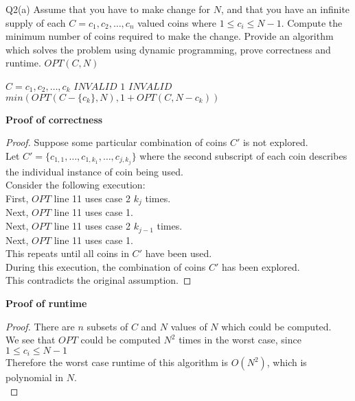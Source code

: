 \begin{problem}
  {Q2(a)}
  Assume that you have to make change for $N$, and that you have an infinite supply of each $C = c_1, c_2, \dots, c_n$ valued coins where $1 \leq c_i \leq N-1$.
  Compute the minimum number of coins required to make the change. Provide an algorithm which solves the problem using dynamic programming, prove correctness and runtime.
  $OPT(C, N)$
  \begin{algorithmic}[1]
      \STATE $C = c_1, c_2, \dots, c_k$
      \RETURN $INVALID$
      \ENDIF
      \RETURN $1$
      \ENDIF
      \RETURN $INVALID$
      \ENDIF
      \RETURN $min(OPT(C - \{c_k\}, N), 1 + OPT(C, N-c_k))$
  \end{algorithmic}
  \noindent
  \textbf{Proof of correctness}
  \begin{proof}
      Suppose some particular combination of coins $C'$ is not explored. \\
      Let $C' = \{c_{1, 1}, \dots, c_{1, k_1}, \dots, c_{j, k_j}\}$ where the second subscript of each coin describes the individual instance of coin being used. \\
      Consider the following execution: \\
      First, $OPT$ line 11 uses case 2 $k_j$ times. \\
      Next, $OPT$ line 11 uses case 1. \\
      Next, $OPT$ line 11 uses case 2 $k_{j-1}$ times. \\
      Next, $OPT$ line 11 uses case 1. \\
      This repeats until all coins in $C'$ have been used. \\
      During this execution, the combination of coins $C'$ has been explored. \\
      This contradicts the original assumption.
  \end{proof}
  \noindent
  \textbf{Proof of runtime}
  \begin{proof}
      There are $n$ subsets of $C$ and $N$ values of $N$ which could be computed. \\
      We see that $OPT$ could be computed $N^2$ times in the worst case, since $1 \leq c_i \leq N-1$ \\
      Therefore the worst case runtime of this algorithm is $O(N^2)$, which is polynomial in $N$. \\
  \end{proof}
\end{problem}
